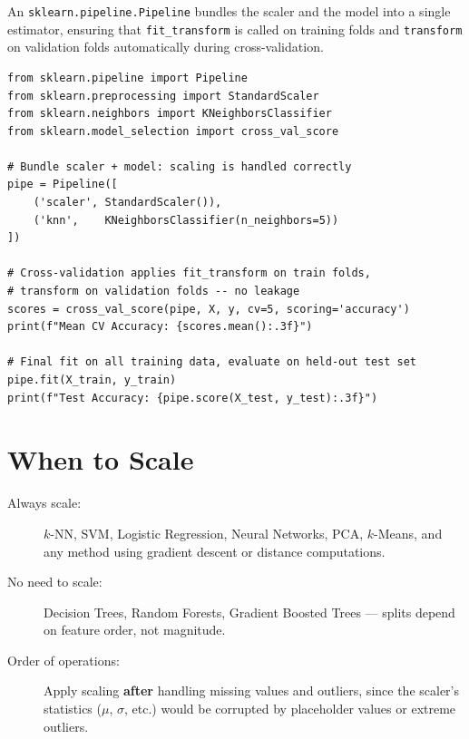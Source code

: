 An \texttt{sklearn.pipeline.Pipeline} bundles the scaler and the model into a single estimator, ensuring that \texttt{fit\_transform} is called on training folds and \texttt{transform} on validation folds automatically during cross-validation.

\begin{lstlisting}[style=pythonstyle]
from sklearn.pipeline import Pipeline
from sklearn.preprocessing import StandardScaler
from sklearn.neighbors import KNeighborsClassifier
from sklearn.model_selection import cross_val_score

# Bundle scaler + model: scaling is handled correctly
pipe = Pipeline([
    ('scaler', StandardScaler()),
    ('knn',    KNeighborsClassifier(n_neighbors=5))
])

# Cross-validation applies fit_transform on train folds,
# transform on validation folds -- no leakage
scores = cross_val_score(pipe, X, y, cv=5, scoring='accuracy')
print(f"Mean CV Accuracy: {scores.mean():.3f}")

# Final fit on all training data, evaluate on held-out test set
pipe.fit(X_train, y_train)
print(f"Test Accuracy: {pipe.score(X_test, y_test):.3f}")
\end{lstlisting}

\section*{When to Scale}

\begin{description}
    \item[Always scale:] $k$-NN, SVM, Logistic Regression, Neural Networks, PCA, $k$-Means, and any method using gradient descent or distance computations.
    \item[No need to scale:] Decision Trees, Random Forests, Gradient Boosted Trees --- splits depend on feature order, not magnitude.
    \item[Order of operations:] Apply scaling \textbf{after} handling missing values and outliers, since the scaler's statistics ($\mu$, $\sigma$, etc.) would be corrupted by placeholder values or extreme outliers.
\end{description}

